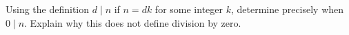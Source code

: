 Using the definition $d\mid n$ if $n=dk$ for some integer $k$, determine precisely when $0\mid n$. Explain why this does not define division by zero.
